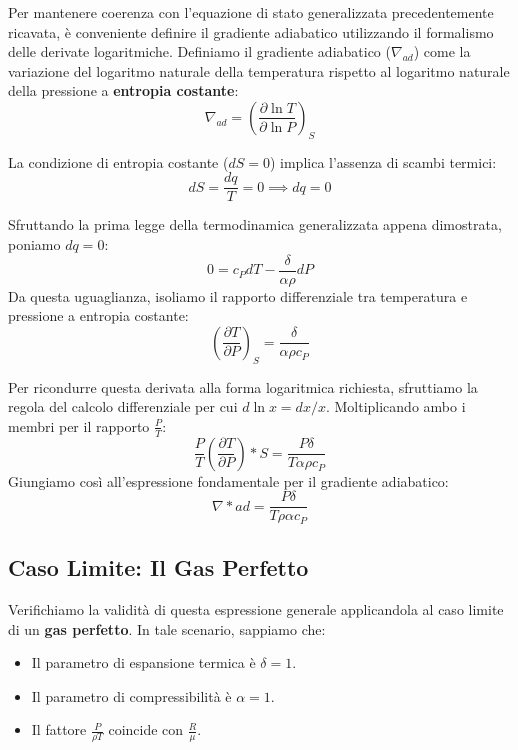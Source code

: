 Per mantenere coerenza con l'equazione di stato generalizzata precedentemente ricavata, è conveniente definire il gradiente adiabatico utilizzando il formalismo delle derivate logaritmiche. Definiamo il gradiente adiabatico ($\nabla_{ad}$) come la variazione del logaritmo naturale della temperatura rispetto al logaritmo naturale della pressione a \textbf{entropia costante}:
\begin{equation}
\nabla_{ad} = \left( \frac{\partial \ln T}{\partial \ln P} \right)_S
\end{equation}

La condizione di entropia costante ($dS = 0$) implica l'assenza di scambi termici:
\begin{equation}
dS = \frac{dq}{T} = 0 \implies dq = 0
\end{equation}

Sfruttando la prima legge della termodinamica generalizzata appena dimostrata, poniamo $dq = 0$:
\begin{equation}
0 = c_P dT - \frac{\delta}{\alpha \rho} dP
\end{equation}
Da questa uguaglianza, isoliamo il rapporto differenziale tra temperatura e pressione a entropia costante:
\begin{equation}
\left( \frac{\partial T}{\partial P} \right)_S = \frac{\delta}{\alpha \rho c_P}
\end{equation}

Per ricondurre questa derivata alla forma logaritmica richiesta, sfruttiamo la regola del calcolo differenziale per cui $d \ln x = dx / x$. Moltiplicando ambo i membri per il rapporto $\frac{P}{T}$:
\begin{equation}
\frac{P}{T} \left( \frac{\partial T}{\partial P} \right)*S = \frac{P \delta}{T \alpha \rho c_P}
\end{equation}
Giungiamo così all'espressione fondamentale per il gradiente adiabatico:
\begin{equation}
\nabla*{ad} = \frac{P \delta}{T \rho \alpha c_P}
\end{equation}

\subsection{Caso Limite: Il Gas Perfetto}
Verifichiamo la validità di questa espressione generale applicandola al caso limite di un \textbf{gas perfetto}. In tale scenario, sappiamo che:
\begin{itemize}
\item Il parametro di espansione termica è $\delta = 1$.
\item Il parametro di compressibilità è $\alpha = 1$.
\item Il fattore $\frac{P}{\rho T}$ coincide con $\frac{R}{\mu}$.
\end{itemize}

